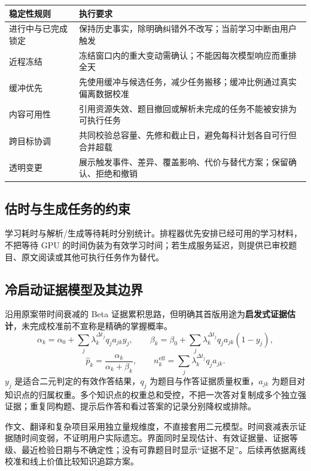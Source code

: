 \documentclass[UTF8,a4paper,11pt,fontset=none]{ctexart}
\newcommand{\cth}[1]{\textbf{\sffamily #1}}
\newcommand{\cont}[1]{\clearpage\noindent{\small\sffamily\color{Muted}#1}\par\vspace{3pt}}
\newenvironment{tbl}{\par\vspace{3pt}\small\noindent\ignorespaces}{\unskip\par\vspace{5pt}}
\begin{document}
\begin{tbl}
\begin{tabularx}{\linewidth}{@{}L{28mm}Y@{}}
\toprule
\cth{稳定性规则}&\cth{执行要求}\\\midrule
进行中与已完成锁定&保持历史事实，除明确纠错外不改写；当前学习中断由用户触发\\
近程冻结&冻结窗口内的重大变动需确认；不能因每次模型响应而重排全天\\
缓冲优先&先使用缓冲与候选任务，减少任务搬移；缓冲比例通过真实偏离数据校准\\
内容可用性&引用资源失效、题目撤回或解析未完成的任务不能被安排为可执行任务\\
跨目标协调&共同校验总容量、先修和截止日，避免每科计划各自可行但合并超载\\
透明变更&展示触发事件、差异、覆盖影响、代价与替代方案；保留确认、拒绝和撤销\\
\bottomrule
\end{tabularx}
\end{tbl}

\subsection{估时与生成任务的约束}
学习耗时与解析/生成等待耗时分别统计。排程器优先安排已经可用的学习材料，不把等待 GPU 的时间伪装为有效学习时间；若生成服务延迟，则提供已审校题目、原文阅读或其他可执行任务作为替代。

\cont{12 / 计划引擎与掌握证据（续）}
\subsection{冷启动证据模型及其边界}
沿用原案带时间衰减的 Beta 证据累积思路，但明确其首版用途为\textbf{启发式证据估计}，未完成校准前不宣称是精确的掌握概率。\cite{original}
\[
\alpha_k=\alpha_0+\sum_j\lambda_k^{\Delta t_j}q_j a_{jk}y_j,\qquad
\beta_k=\beta_0+\sum_j\lambda_k^{\Delta t_j}q_j a_{jk}(1-y_j),
\]
\[
\widehat p_k=\frac{\alpha_k}{\alpha_k+\beta_k},\qquad
n^{\mathrm{eff}}_k=\sum_j\lambda_k^{\Delta t_j}q_j a_{jk}.
\]
$y_j$ 是适合二元判定的有效作答结果，$q_j$ 为题目与作答证据质量权重，$a_{jk}$ 为题目对知识点的归属权重。多个知识点的权重总和受控，不把一次答对复制成多个独立强证据；重复同构题、提示后作答和看过答案的记录分别降权或排除。

作文、翻译和复杂项目采用独立量规维度，不直接套用二元模型。时间衰减表示证据随时间变弱，不证明用户实际遗忘。界面同时呈现估计、有效证据量、证据等级、最近检验日期与不确定性；没有可靠题目时显示“证据不足”。后续再依据离线校准和线上价值比较知识追踪方案。
\end{document}
